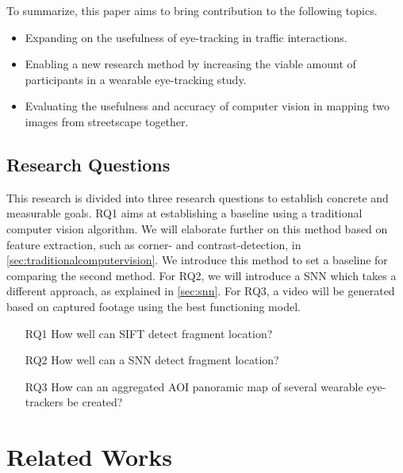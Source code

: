 \documentclass[sigconf, natbib=false, nonacm]{acmart}
\begin{document}
    To summarize, this paper aims to bring contribution to the following topics. 
    
    \begin{itemize}
        \item Expanding on the usefulness of eye-tracking in traffic interactions.
        \item Enabling a new research method by increasing the viable amount of participants in a wearable eye-tracking study.
        \item Evaluating the usefulness and accuracy of computer vision in mapping two images from streetscape together. 
    \end{itemize}
    
    \subsection{Research Questions}
        This research is divided into three research questions to establish concrete and measurable goals. RQ1 aims at establishing a baseline using a traditional computer vision algorithm. We will elaborate further on this method based on feature extraction, such as corner- and contrast-detection, in \autoref{sec:traditionalcomputervision}. We introduce this method to set a baseline for comparing the second method. For RQ2, we will introduce a SNN which takes a different approach, as explained in \autoref{sec:snn}. For RQ3, a video will be generated based on captured footage using the best functioning model. 
    
        \begin{itemize}
            \item[RQ1] How well can SIFT detect fragment location? 
            \item[RQ2] How well can a SNN detect fragment location?
            \item[RQ3] How can an aggregated AOI panoramic map of several wearable eye-trackers be created?
        \end{itemize}

\section{Related Works}\label{sec:relatedworks}
        
\end{document}
